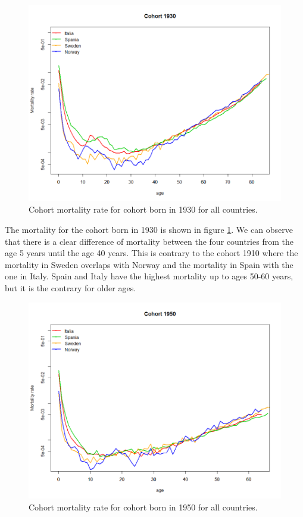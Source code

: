             
              
          \begin{figure}[tbh]
             \centering
              \includegraphics[width=0.8\linewidth]{figures/cohortMortalityRate_allCountries1930.png}
              \caption{Cohort  mortality rate for cohort born in 1930 for all countries.}
              \label{fig:CohortMortality 1930}
            \end{figure} 
The mortality for the cohort born in 1930 is shown in figure \ref{fig:CohortMortality 1930}.
We can observe that there is a clear difference of mortality between the four countries from the age 5 years until the age 40 years.
This is contrary to the cohort 1910 where the mortality in Sweden overlaps with Norway and the mortality in Spain with the one in Italy.        
Spain and Italy have the highest mortality up to ages 50-60 years, but it is the contrary for older ages.            
            
              
          \begin{figure}[tbh]
             \centering
              \includegraphics[width=0.8\linewidth]{figures/cohortMortalityRate_allCountries1950.png}
              \caption{Cohort mortality rate for cohort born in 1950 for all countries.}
              \label{fig:CohortMortality 1950}
            \end{figure} 
            
